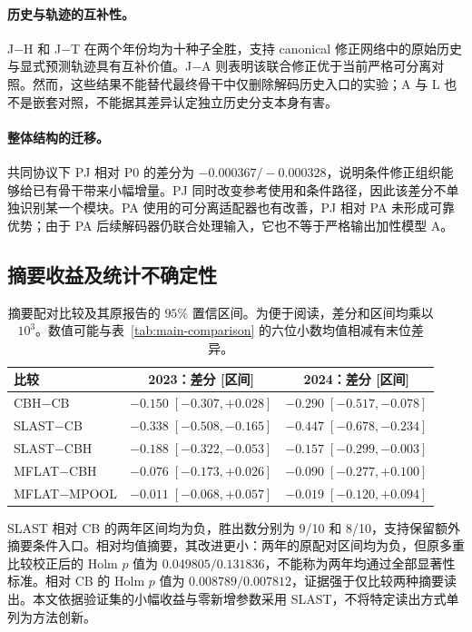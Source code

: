 \paragraph{历史与轨迹的互补性。}
J$-$H 和 J$-$T 在两个年份均为十种子全胜，支持 canonical 修正网络中的原始历史与显式预测轨迹具有互补价值。J$-$A 则表明该联合修正优于当前严格可分离对照。然而，这些结果不能替代最终骨干中仅删除解码历史入口的实验；A 与 L 也不是嵌套对照，不能据其差异认定独立历史分支本身有害。

\paragraph{整体结构的迁移。}
共同协议下 PJ 相对 P0 的差分为 $-0.000367/-0.000328$，说明条件修正组织能够给已有骨干带来小幅增量。PJ 同时改变参考使用和条件路径，因此该差分不单独识别某一个模块。PA 使用的可分离适配器也有改善，PJ 相对 PA 未形成可靠优势；由于 PA 后续解码器仍联合处理输入，它也不等于严格输出加性模型 A。

\subsection{摘要收益及统计不确定性}

\begin{table}[tbp]
 \centering
 \caption{摘要配对比较及其原报告的 $95\%$ 置信区间。为便于阅读，差分和区间均乘以 $10^3$。数值可能与表~\ref{tab:main-comparison} 的六位小数均值相减有末位差异。}
 \label{tab:summary-paired}
 \small
 \setlength{\tabcolsep}{5pt}
 \begin{tabular}{lcc}
 \toprule
 比较 & 2023：差分 [区间] & 2024：差分 [区间] \\
 \midrule
 CBH$-$CB & $-0.150\;[-0.307,+0.028]$ & $-0.290\;[-0.517,-0.078]$ \\
 SLAST$-$CB & $-0.338\;[-0.508,-0.165]$ & $-0.447\;[-0.678,-0.234]$ \\
 SLAST$-$CBH & $-0.188\;[-0.322,-0.053]$ & $-0.157\;[-0.299,-0.003]$ \\
 MFLAT$-$CBH & $-0.076\;[-0.173,+0.026]$ & $-0.090\;[-0.277,+0.100]$ \\
 MFLAT$-$MPOOL & $-0.011\;[-0.068,+0.057]$ & $-0.019\;[-0.120,+0.094]$ \\
 \bottomrule
 \end{tabular}
\end{table}

SLAST 相对 CB 的两年区间均为负，胜出数分别为 9/10 和 8/10，支持保留额外摘要条件入口。相对均值摘要，其改进更小：两年的原配对区间均为负，但原多重比较校正后的 Holm $p$ 值为 $0.049805/0.131836$，不能称为两年均通过全部显著性标准。相对 CB 的 Holm $p$ 值为 $0.008789/0.007812$，证据强于仅比较两种摘要读出。本文依据验证集的小幅收益与零新增参数采用 SLAST，不将特定读出方式单列为方法创新。

